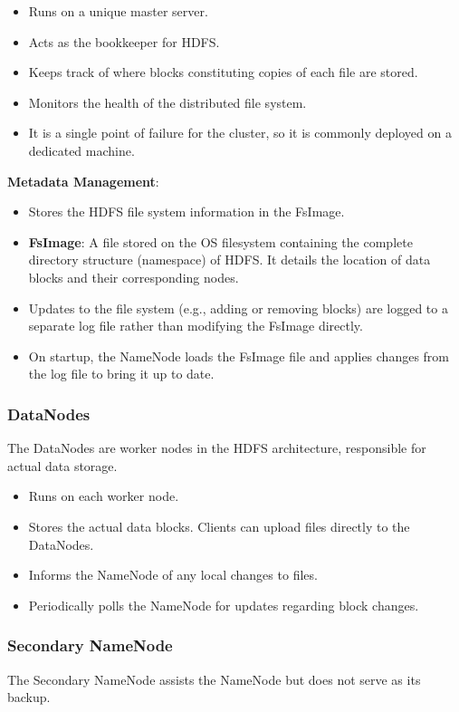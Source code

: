 \documentclass[12pt]{article}
\begin{document}
\begin{itemize}
    \item Runs on a unique master server.
    \item Acts as the bookkeeper for HDFS.
    \item Keeps track of where blocks constituting copies of each file are stored.
    \item Monitors the health of the distributed file system.
    \item It is a single point of failure for the cluster, so it is commonly deployed on a dedicated machine.
\end{itemize}

\textbf{Metadata Management}:
\begin{itemize}
    \item Stores the HDFS file system information in the FsImage.
    \item \textbf{FsImage}: A file stored on the OS filesystem containing the complete directory structure (namespace) of HDFS. It details the location of data blocks and their corresponding nodes.
    \item Updates to the file system (e.g., adding or removing blocks) are logged to a separate log file rather than modifying the FsImage directly.
    \item On startup, the NameNode loads the FsImage file and applies changes from the log file to bring it up to date.
\end{itemize}

\subsubsection{DataNodes}
The DataNodes are worker nodes in the HDFS architecture, responsible for actual data storage.

\begin{itemize}
    \item Runs on each worker node.
    \item Stores the actual data blocks. Clients can upload files directly to the DataNodes.
    \item Informs the NameNode of any local changes to files.
    \item Periodically polls the NameNode for updates regarding block changes.
\end{itemize}

\subsubsection{Secondary NameNode}
The Secondary NameNode assists the NameNode but does not serve as its backup.
\end{document}
